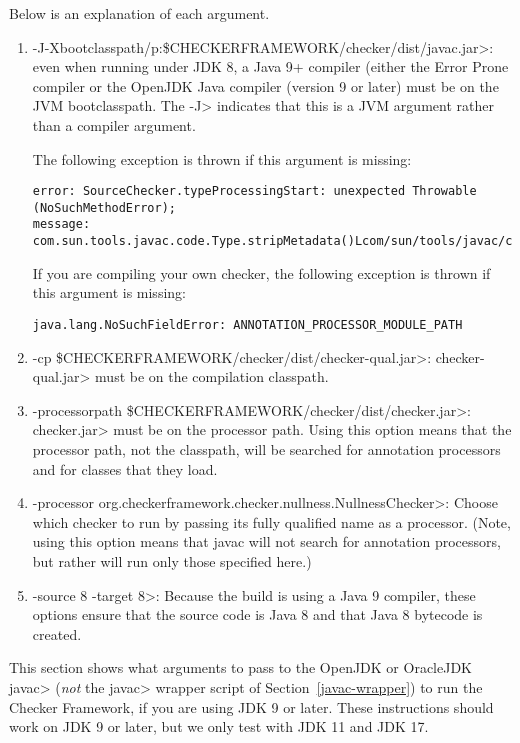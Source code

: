 Below is an explanation of each argument.
\begin{enumerate}
\item \<-J-Xbootclasspath/p:\$CHECKERFRAMEWORK/checker/dist/javac.jar>:
even when running under JDK 8, a Java 9+ compiler (either the Error Prone
compiler or the OpenJDK Java compiler (version 9 or later) must be on the JVM bootclasspath.
The \<-J> indicates that this is a JVM argument rather than a compiler
argument.

The following exception is thrown if this argument is missing:
\begin{Verbatim}
error: SourceChecker.typeProcessingStart: unexpected Throwable (NoSuchMethodError);
message: com.sun.tools.javac.code.Type.stripMetadata()Lcom/sun/tools/javac/code/Type;
\end{Verbatim}

If you are compiling your own checker, the following exception is thrown if this argument is missing:
\begin{Verbatim}
java.lang.NoSuchFieldError: ANNOTATION_PROCESSOR_MODULE_PATH
\end{Verbatim}

\item \<-cp \$CHECKERFRAMEWORK/checker/dist/checker-qual.jar>: \<checker-qual.jar>
must be on the compilation classpath.

\item \<-processorpath \$CHECKERFRAMEWORK/checker/dist/checker.jar>:
\<checker.jar> must be on the processor path. Using this option means that the processor path, not
the classpath, will be searched for annotation processors
and for classes that they load.

\item \<-processor org.checkerframework.checker.nullness.NullnessChecker>:
Choose which checker to run by passing its fully qualified name as a processor.
(Note, using this option means that javac will not search for annotation
processors, but rather will run only those specified here.)

\item \<-source 8 -target 8>: Because the build is using
a Java 9 compiler, these options ensure that the
source code is Java 8 and that Java 8 bytecode is created.

\end{enumerate}



This section shows what arguments to pass to the OpenJDK or OracleJDK
\<javac> (\emph{not} the \<javac> wrapper script of
Section~\ref{javac-wrapper}) to run the Checker
Framework, if you are using JDK 9 or later.  These
instructions should work on JDK 9 or later, but we only test with JDK 11 and JDK 17.


